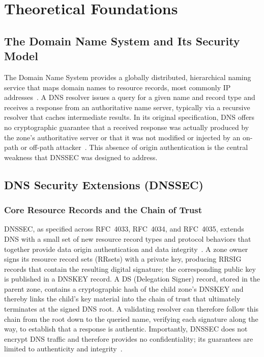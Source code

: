 \documentclass[conference]{IEEEtran}
\begin{document}
\section{Theoretical Foundations}
\label{sec:foundations}

\subsection{The Domain Name System and Its Security Model}

The Domain Name System provides a globally distributed, hierarchical naming
service that maps domain names to resource records, most commonly IP
addresses~\cite{rfc1035}. A DNS resolver issues a query for a given name and
record type and receives a response from an authoritative name server,
typically via a recursive resolver that caches intermediate results. In its
original specification, DNS offers no cryptographic guarantee that a received
response was actually produced by the zone's authoritative server or that it
was not modified or injected by an on-path or off-path attacker~\cite{rfc4033}.
This absence of origin authentication is the central weakness that DNSSEC was
designed to address.

\subsection{DNS Security Extensions (DNSSEC)}

\subsubsection{Core Resource Records and the Chain of Trust}

DNSSEC, as specified across RFC~4033, RFC~4034, and RFC~4035, extends DNS with
a small set of new resource record types and protocol behaviors that together
provide data origin authentication and data
integrity~\cite{rfc4033,rfc4034,rfc4035}. A zone owner signs its resource
record sets (RRsets) with a private key, producing RRSIG records that contain
the resulting digital signature; the corresponding public key is published in a
DNSKEY record. A DS (Delegation Signer) record, stored in the parent zone,
contains a cryptographic hash of the child zone's DNSKEY and thereby links the
child's key material into the chain of trust that ultimately terminates at the
signed DNS root. A validating resolver can therefore follow this chain from the
root down to the queried name, verifying each signature along the way, to
establish that a response is authentic. Importantly, DNSSEC does not encrypt
DNS traffic and therefore provides no confidentiality; its guarantees are
limited to authenticity and integrity~\cite{rfc4033}.
\end{document}

